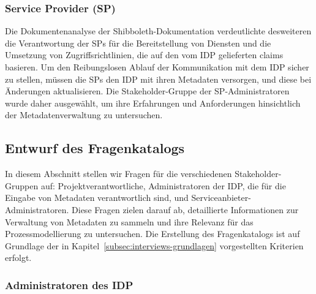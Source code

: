 \documentclass[a4paper, fontsize=11pt]{scrartcl}
\begin{document}
\subsubsection{Service Provider (SP)}
Die Dokumentenanalyse der Shibboleth-Dokumentation verdeutlichte desweiteren die Verantwortung der SPs für die Bereitstellung von Diensten und die Umsetzung von Zugriffsrichtlinien, die auf den vom IDP gelieferten claims basieren.
Um den Reibungslosen Ablauf der Kommunikation mit dem IDP sicher zu stellen, müssen die SPs den IDP mit ihren Metadaten versorgen, und diese bei Änderungen aktualisieren.
Die Stakeholder-Gruppe der SP-Administratoren wurde daher ausgewählt, um ihre Erfahrungen und Anforderungen hinsichtlich der Metadatenverwaltung zu untersuchen.

\subsection{Entwurf des Fragenkatalogs}\label{subsubsec:entwurf-fragenkatalog}

In diesem Abschnitt stellen wir Fragen für die verschiedenen Stakeholder-Gruppen auf: Projektverantwortliche, Administratoren der IDP, die für die Eingabe von Metadaten verantwortlich sind, und Serviceanbieter-Administratoren. 
Diese Fragen zielen darauf ab, detaillierte Informationen zur Verwaltung von Metadaten zu sammeln und ihre Relevanz für das Prozessmodellierung zu untersuchen.
Die Erstellung des Fragenkatalogs ist auf Grundlage der in Kapitel~\ref{subsec:interviews-grundlagen} vorgestellten Kriterien erfolgt.

\subsubsection{Administratoren des IDP}
\end{document}
